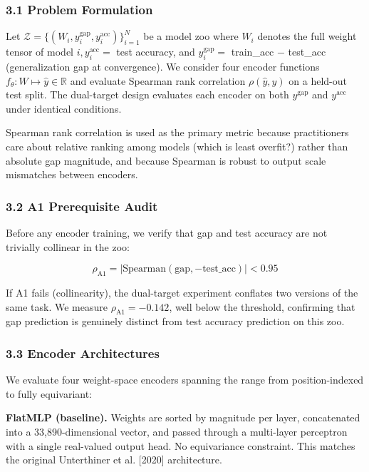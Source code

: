 
\subsubsection{3.1 Problem Formulation}

Let $\mathcal{Z} = \{(W_i, y_i^{\text{gap}}, y_i^{\text{acc}})\}_{i=1}^N$ be a model zoo where $W_i$
denotes the full weight tensor of model $i, y_i^{\text{acc}} = $ test accuracy, and
$y_i^{\text{gap}} = $ train\_acc $-$ test\_acc (generalization gap at convergence). We consider four
encoder functions $f_\theta : W \mapsto \hat{y} \in \mathbb{R}$ and evaluate Spearman rank correlation
$\rho(\hat{y}, y)$ on a held-out test split. The dual-target design evaluates each encoder on both
$y^{\text{gap}}$ and $y^{\text{acc}}$ under identical conditions.

Spearman rank correlation is used as the primary metric because practitioners care about relative
ranking among models (which is least overfit?) rather than absolute gap magnitude, and because
Spearman is robust to output scale mismatches between encoders.

\subsubsection{3.2 A1 Prerequisite Audit}

Before any encoder training, we verify that gap and test accuracy are not trivially collinear in the zoo:

$$\rho_{\text{A1}} = |\text{Spearman}(\text{gap}, -\text{test\_acc})| < 0.95$$

If A1 fails (collinearity), the dual-target experiment conflates two versions of the same task. We measure
$\rho_{\text{A1}} = -0.142$, well below the threshold, confirming that gap prediction is genuinely
distinct from test accuracy prediction on this zoo.

\subsubsection{3.3 Encoder Architectures}

We evaluate four weight-space encoders spanning the range from position-indexed to fully equivariant:

\textbf{FlatMLP (baseline).} Weights are sorted by magnitude per layer, concatenated into a 33,890-dimensional
vector, and passed through a multi-layer perceptron with a single real-valued output head. No equivariance
constraint. This matches the original Unterthiner et al. [2020] architecture.

